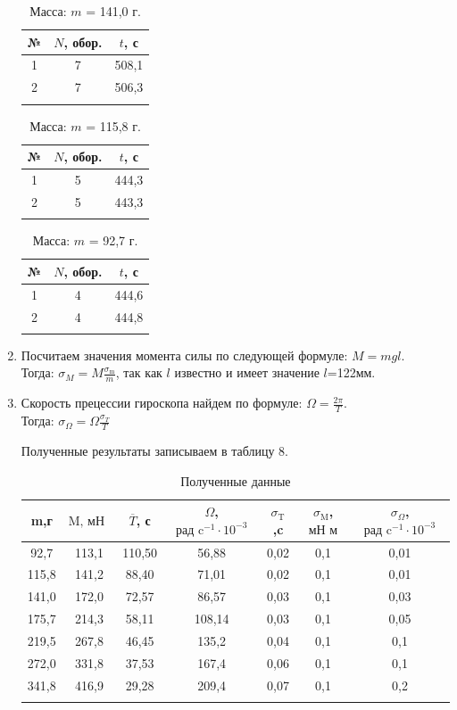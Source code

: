 \documentclass[a4paper, 12pt]{article}%
\begin{document}
\begin{enumerate}
		\begin{minipage}{0.4\textwidth}
		\begin{longtable}{|c|c|c|}
			\hline 
			№ & $N$, обор. & $t$, с \\
			\hline
			1 & 7 & 508,1\\
			\hline
			2 &7 & 506,3\\
			\hline
			\caption{Масса: $m$ = 141,0 г.}
		\end{longtable}
	\end{minipage}
		\begin{minipage}{0.4\textwidth}
		\begin{longtable}{|c|c|c|}
			\hline 
			№ & $N$, обор. & $t$, с \\
			\hline
			1 & 5 & 444,3\\
			\hline
			2 & 5 & 443,3 \\
			\hline
			\caption{Масса: $m$ = 115,8 г.}
		\end{longtable}
	\end{minipage}
	
	\begin{longtable}{|c|c|c|}
		\hline 
		№ & $N$, обор. & $t$, с \\
		\hline
		1 & 4 & 444,6\\
		\hline
		2 & 4 & 444,8 \\
		\hline
		\caption{Масса: $m$ = 92,7 г.}
	\end{longtable}

	 \item Посчитаем значения момента силы по следующей формуле: $M = mgl.$ \\
	  Тогда:
		$\sigma_M = M \frac{\sigma_\text{m}}{m}$, так как $l$ известно и имеет значение $l$=122мм.
	\item Скорость прецессии гироскопа найдем по формуле:	$\Omega = \frac{2\pi}{T}.$ \\Тогда: $\sigma_{\Omega}=\Omega\frac{\sigma_T}{T} $
	
	Полученные результаты записываем в таблицу 8.
	\newpage
	\begin{longtable}{|c|c|c|c|c|c|c|}
		\hline 		
		m,г &$\text{M, мН м} $ & $\overline T$, с&$\Omega$, $\text{рад} \text{ c}^{-1}\cdot10^{-3}$ &$\sigma_\text{T}$,c &$\sigma_\text{M}$, $\text{мН м} $& $\sigma_{\Omega}$, $\text{рад} \text{ c}^{-1}\cdot10^{-3}$ \\
		\hline
		92,7&113,1&110,50&56,88&0,02&0,1&0,01\\
		\hline
		115,8 &141,2 & 88,40 &71,01 & 0,02&0,1&0,01\\
		\hline
		141,0 & 172,0& 72,57 &86,57&0,03&0,1&0,03\\
		\hline
		175,7 & 214,3& 58,11 &108,14&0,03&0,1&0,05\\
		\hline
		219,5 & 267,8& 46,45 &135,2&0,04&0,1&0,1\\
		\hline
		272,0 & 331,8& 37,53 &167,4&0,06&0,1&0,1\\
		\hline
		341,8 & 416,9& 29,28 &209,4&0,07&0,1&0,2\\
		\hline
		\caption{Полученные данные}
	\end{longtable}
	

\end{enumerate}
\end{document}
